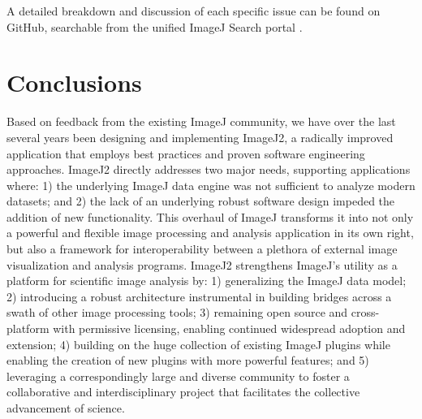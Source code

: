 \documentclass{bmcart}
\begin{document}
A detailed breakdown and discussion of each specific issue can be found on
GitHub, searchable from the unified ImageJ Search portal \cite{imagej_search}.


\section*{Conclusions}
Based on feedback from the existing ImageJ community, we have over the last
several years been designing and implementing ImageJ2, a radically improved
application that employs best practices and proven software engineering
approaches. ImageJ2 directly addresses two major needs, supporting applications
where: 1) the underlying ImageJ data engine was not sufficient to analyze
modern datasets; and 2) the lack of an underlying robust software design
impeded the addition of new functionality. This overhaul of ImageJ transforms
it into not only a powerful and flexible image processing and analysis
application in its own right, but also a framework for interoperability between
a plethora of external image visualization and analysis programs. ImageJ2
strengthens ImageJ's utility as a platform for scientific image analysis by: 1)
generalizing the ImageJ data model; 2) introducing a robust architecture
instrumental in building bridges across a swath of other image processing
tools; 3) remaining open source and cross-platform with permissive licensing,
enabling continued widespread adoption and extension; 4) building on the huge
collection of existing ImageJ plugins while enabling the creation of new
plugins with more powerful features; and 5) leveraging a correspondingly large
and diverse community to foster a collaborative and interdisciplinary project
that facilitates the collective advancement of science.


\printglossary[title=List of abbreviations,type=\acronymtype,style=long]

\end{document}
